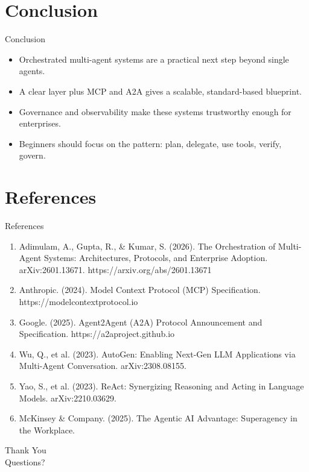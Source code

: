 \documentclass[10pt]{beamer}
\begin{document}
\section{Conclusion}
\begin{frame}{Conclusion}
\begin{itemize}
  \item Orchestrated multi-agent systems are a practical next step beyond single agents.
  \item A clear layer plus MCP and A2A gives a scalable, standard-based blueprint.
  \item Governance and observability make these systems trustworthy enough for enterprises.
  \item Beginners should focus on the pattern: plan, delegate, use tools, verify, govern.
\end{itemize}
\end{frame}
\section{References}
\begin{frame}[allowframebreaks]{References}
  \footnotesize
  \begin{enumerate}
    \item Adimulam, A., Gupta, R., \& Kumar, S. (2026). The Orchestration of Multi-Agent Systems: Architectures, Protocols, and Enterprise Adoption. arXiv:2601.13671. https://arxiv.org/abs/2601.13671
    \item Anthropic. (2024). Model Context Protocol (MCP) Specification. https://modelcontextprotocol.io
    \item Google. (2025). Agent2Agent (A2A) Protocol Announcement and Specification. https://a2aproject.github.io
    \item Wu, Q., et al. (2023). AutoGen: Enabling Next-Gen LLM Applications via Multi-Agent Conversation. arXiv:2308.08155.
    \item Yao, S., et al. (2023). ReAct: Synergizing Reasoning and Acting in Language Models. arXiv:2210.03629.
    \item McKinsey \& Company. (2025). The Agentic AI Advantage: Superagency in the Workplace.
  \end{enumerate}
\end{frame}
\begin{frame}[plain]
  \begin{center}
    {\Huge Thank You}\\[1em]
    {\large Questions?}
  \end{center}
\end{frame}
\end{document}
